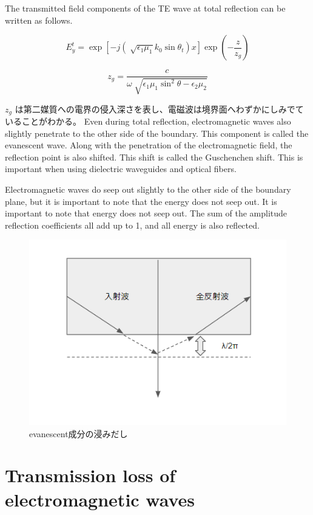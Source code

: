 \documentclass[a4paper,11pt]{jsarticle}
\begin{document}
The transmitted field components of the TE wave at total reflection
can be written as follows.


\begin{equation}
  E^t_y = \exp[-j(\sqrt[]{\epsilon_1\mu_1}k_0\sin\theta_t)x]\exp\left(-\frac{z}{z_g}\right)
\end{equation}

\begin{equation}
  z_g = \frac{c}{\omega\sqrt[]{\epsilon_1\mu_1\sin^{2}\theta - \epsilon_2\mu_2}}
\end{equation}

$z_g$ は第二媒質への電界の侵入深さを表し、電磁波は境界面へわずかにしみでていることがわかる。
Even during total reflection, 
electromagnetic waves also slightly penetrate to the other side of the boundary.
This component is called the evanescent wave.
Along with the penetration of the electromagnetic field,
the reflection point is also shifted.
This shift is called the Guschenchen shift.
This is important when using dielectric waveguides and optical fibers.


Electromagnetic waves do seep out slightly
to the other side of the boundary plane,
but it is important to note that the energy does not seep out.
It is important to note that energy does not seep out.
The sum of the amplitude reflection coefficients all add up to 1,
and all energy is also reflected.

\begin{figure}
  \begin{center}
    \includegraphics[clip, keepaspectratio, width=0.5\linewidth]{img/insertion_reflection_evanescence.png}
    \caption{evanescent成分の浸みだし}
    \label{fig:insertion_reflection_evanescent}
  \end{center}
\end{figure}


\section{Transmission loss of electromagnetic waves}
\end{document}
